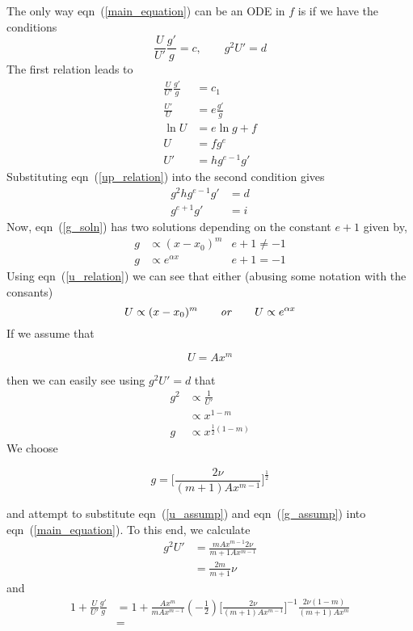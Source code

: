 \documentclass[11pt]{article}
\newcommand{\eqn}[2]{
  \begin{equation}
    \label{#1}
    #2
  \end{equation}
}
\newcommand{\eqr}[1]{eqn~(\ref{#1})}
\begin{document}
\begin{description}
The only way \eqr{main_equation} can be an ODE in $f$ is if we have the conditions
$$
  \frac{U}{U'}\frac{g'}{g} = c,
  \qquad
  g^2 U' = d
$$
The first relation leads to
\begin{align}
\nonumber  \frac{U}{U'}\frac{g'}{g} &= c_1 \\
\nonumber  \frac{U'}{U} &= e \frac{g'}{g} \\
\nonumber  \ln U &= e\ln g + f \\
\label{u_relation}  U &= f g^e \\
\label{up_relation}  U' &= h g^{e-1} g'
\end{align}
Substituting \eqr{up_relation} into the second condition gives
\begin{align}
\nonumber  g^2 h g^{e-1} g' &= d \\
\label{g_soln} g^{e+1} g' &= i
\end{align}
Now, \eqr{g_soln} has two solutions depending on the constant $e+1$ given by,
\begin{align}
\label{g_soln_1} g &\propto (x - x_0)^m & e+1 \neq -1 \\
\label{g_soln_2} g &\propto e^{\alpha x} & e+1 = -1
\end{align}
Using \eqr{u_relation} we can see that either (abusing some notation with the consants)
$$
  U \propto (x - x_0)^m
  \qquad
  \text{\emph{or}}
  \qquad
  U \propto e^{\alpha x}
$$
If we assume that
\eqn{u_assump}{
  U = Ax^m
}
then we can easily see using $g^2 U' = d$ that
\begin{align}
\nonumber g^2 &\propto \frac{1}{U'} \\
\nonumber &\propto x^{1-m} \\
\label{g_propto} g &\propto x^{\frac{1}{2}(1-m)}
\end{align}
We choose
\eqn{g_assump}{
  g
  = 
  \bigg[
  \frac{2\nu}{(m+1)Ax^{m-1}}
  \bigg]^\frac{1}{2}
}
and attempt to substitute \eqr{u_assump} and \eqr{g_assump} into \eqr{main_equation}.
To this end, we calculate
\begin{align}
  \nonumber
  g^2 U'
  &=
  \frac{mAx^{m-1} 2\nu}{m+1 A x^{m-1}}
  \\
%
%
  \label{second_term}
  &=
  \frac{2m}{m+1}\nu
\end{align}
and
\begin{align}
  \nonumber
  1 + \frac{U}{U'}\frac{g'}{g} 
  &=
  1
  + \frac{Ax^m}{mAx^{m-1}}
  (-\frac{1}{2})
  \bigg[
  \frac{2\nu}{(m+1)Ax^{m-1}}
  \bigg]^{-1}
  \frac{2\nu(1-m)}{(m+1)A x^m}
  \\
%
%
  \nonumber
  &=

\end{align}
\end{description}
\end{document}
